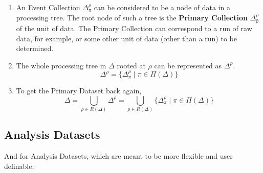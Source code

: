 \documentclass{cmspaper}
\begin{document}
\begin{enumerate}
\item An Event Collection $\Delta_{\pi}^{\rho}$ can 
be considered to be a node of data in a processing tree.  
The root node of such a tree is the {\bf Primary Collection} $\Delta_{\emptyset}^{\rho}$ 
of the unit of data.  The Primary Collection can correspond to a 
run of raw data, for example, or some other unit of data 
(other than a run) to be determined.  

\item The whole processing tree in $\Delta$ rooted 
at $\rho$ can be represented as $\Delta^{\rho}$. 
\begin{equation}
\Delta^{\rho} = \{ \Delta_{\pi}^{\rho} \mid \pi \in \Pi(\Delta) \}
\end{equation}

\item To get the Primary Dataset back again, 
\begin{equation}
\Delta = \bigcup_{\rho \in R(\Delta)} \Delta^{\rho} = \bigcup_{\rho \in R(\Delta)} \{ \Delta_{\pi}^{\rho} \mid \pi \in \Pi(\Delta) \} 
\end{equation}

\end{enumerate}


\subsection{Analysis Datasets}

And for Analysis Datasets, which are meant to be more flexible and user definable: 
\end{document}
